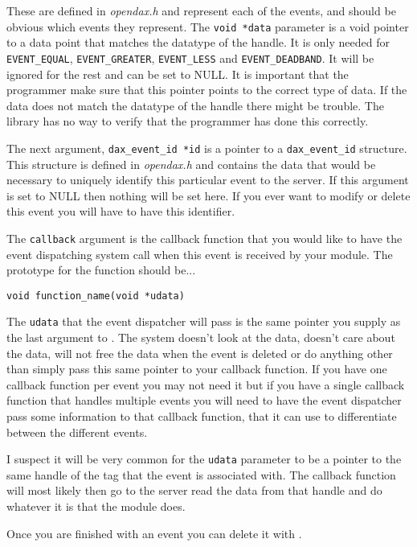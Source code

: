 These are defined in \textit{opendax.h} and represent each of the events, and should be obvious which events they represent.  The \verb|void *data| parameter is a void pointer to a data point that matches the datatype of the handle.  It is only needed for \verb|EVENT_EQUAL|, \verb|EVENT_GREATER|, \verb|EVENT_LESS| and \verb|EVENT_DEADBAND|.  It will be ignored for the rest and can be set to NULL.  It is important that the programmer make sure that this pointer points to the correct type of data.  If the data does not match the datatype of the handle there might be trouble.  The library has no way to verify that the programmer has done this correctly.

The next argument, \verb|dax_event_id *id| is a pointer to a \texttt{dax\_event\_id} structure.  This structure is defined in \textit{opendax.h} and contains the data that would be necessary to uniquely identify this particular event to the server.  If this argument is set to NULL then nothing will be set here.  If you ever want to modify or delete this event you will have to have this identifier.

The \texttt{callback} argument is the callback function that you would like to have the event dispatching system call when this event is received by your module.  The prototype for the function should be...
\begin{verbatim}
void function_name(void *udata)
\end{verbatim}
The \texttt{udata} that the event dispatcher will pass is the same pointer you supply as the last argument to \eventadd.  The system doesn't look at the data, doesn't care about the data, will not free the data when the event is deleted or do anything other than simply pass this same pointer to your callback function.  If you have one callback function per event you may not need it but if you have a single callback function that handles multiple events you will need to have the event dispatcher pass some information to that callback function, that it can use to differentiate between the different events.

I suspect it will be very common for the \texttt{udata} parameter to be a pointer to the same handle of the tag that the event is associated with.  The callback function will most likely then go to the server read the data from that handle and do whatever it is that the module does.

Once you are finished with an event you can delete it with \eventdel.

